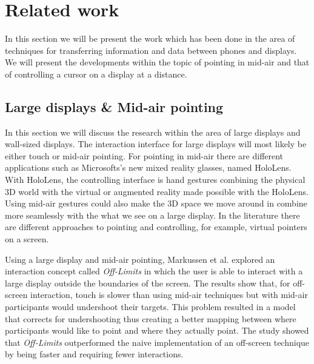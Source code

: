 \section{Related work} \label{sec:relatedwork}
In this section we will be present the work which has been done in the area of techniques for transferring information and data between phones and displays.
We will present the developments within the topic of pointing in mid-air and that of controlling a cursor on a display at a distance.

\subsection{Large displays \& Mid-air pointing} \label{sec:largeDisplayAirPointing}
In this section we will discuss the research within the area of large displays and wall-sized displays.
The interaction interface for large displays will most likely be either touch or mid-air pointing.
For pointing in mid-air there are different applications such as Microsofts's new mixed reality glasses, named HoloLens.
With HoloLens, the controlling interface is hand gestures combining the physical 3D world with the virtual or augmented reality made possible with the HoloLens.
Using mid-air gestures could also make the 3D space we move around in combine more seamlessly with the what we see on a large display.
In the literature there are different approaches to pointing and controlling, for example, virtual pointers on a screen. 

Using a large display and mid-air pointing, Markussen et al. \cite{Markussen:2016} explored an interaction concept called \emph{Off-Limits} in which the user is able to interact with a large display outside the boundaries of the screen.
The results show that, for off-screen interaction, touch is slower than using mid-air techniques but with mid-air participants would undershoot their targets.
This problem resulted in a model that corrects for undershooting thus creating a better mapping between where participants would like to point and where they actually point.
The study showed that \emph{Off-Limits} outperformed the naive implementation of an off-screen technique by being faster and requiring fewer interactions.

